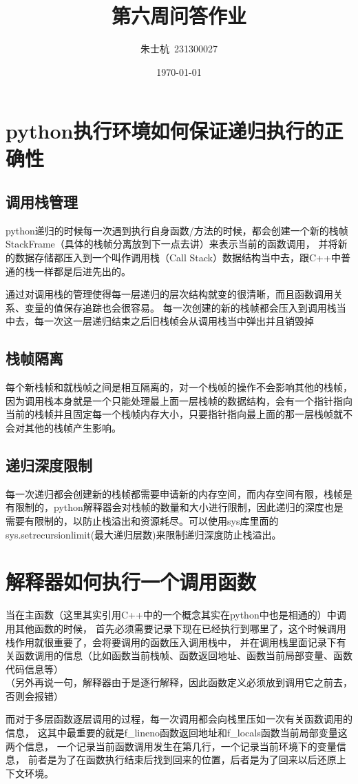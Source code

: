 \documentclass[10pt]{article}
\title{第六周问答作业}
\author{朱士杭\ 231300027}
\date{\kaishu \today}
\begin{document}
	\maketitle
	\section{python执行环境如何保证递归执行的正确性}
	\subsection{调用栈管理}
	python递归的时候每一次遇到执行自身函数/方法的时候，都会创建一个新的栈帧StackFrame（具体的栈帧分离放到下一点去讲）来表示当前的函数调用，
	并将新的数据存储都压入到一个叫作调用栈（Call Stack）数据结构当中去，跟C++中普通的栈一样都是后进先出的。\par
	通过对调用栈的管理使得每一层递归的层次结构就变的很清晰，而且函数调用关系、变量的值保存追踪也会很容易。
	每一次创建的新的栈帧都会压入到调用栈当中去，每一次这一层递归结束之后旧栈帧会从调用栈当中弹出并且销毁掉
	\subsection{栈帧隔离}
	每个新栈帧和就栈帧之间是相互隔离的，对一个栈帧的操作不会影响其他的栈帧，因为调用栈本身就是一个只能处理最上面一层栈帧的数据结构，会有一个指针指向当前的栈帧并且固定每一个栈帧内存大小，只要指针指向最上面的那一层栈帧就不会对其他的栈帧产生影响。
	\subsection{递归深度限制}
	每一次递归都会创建新的栈帧都需要申请新的内存空间，而内存空间有限，栈帧是有限制的，python解释器会对栈帧的数量和大小进行限制，因此递归的深度也是需要有限制的，以防止栈溢出和资源耗尽。可以使用sys库里面的sys.setrecursionlimit(最大递归层数)来限制递归深度防止栈溢出。
	\section{解释器如何执行一个调用函数}
	当在主函数（这里其实引用C++中的一个概念其实在python中也是相通的）中调用其他函数的时候，
	首先必须需要记录下现在已经执行到哪里了，这个时候调用栈作用就很重要了，会将要调用的函数压入调用栈中，
	并在调用栈里面记录下有关函数调用的信息（比如函数当前栈帧、函数返回地址、函数当前局部变量、函数代码信息等）\\
	（另外再说一句，解释器由于是逐行解释，因此函数定义必须放到调用它之前去，否则会报错）\par
	而对于多层函数逐层调用的过程，每一次调用都会向栈里压如一次有关函数调用的信息，
	这其中最重要的就是f\_lineno函数返回地址和f\_locals函数当前局部变量这两个信息，
	一个记录当前函数调用发生在第几行，一个记录当前环境下的变量信息，
	前者是为了在函数执行结束后找到回来的位置，后者是为了回来以后还原上下文环境。
\end{document}
